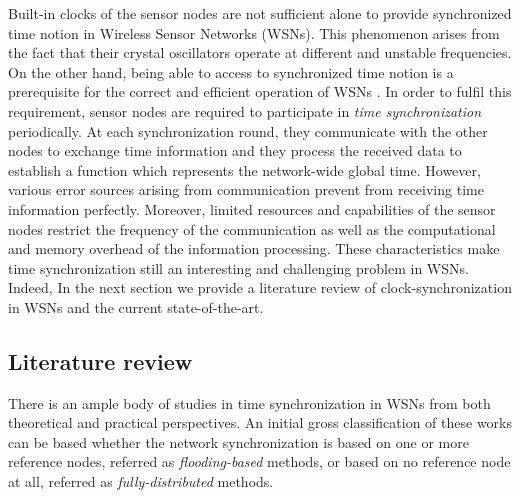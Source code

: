 \documentclass[english,a4paper,10pt,final]{article}
\numberwithin{equation}{section}
\numberwithin{figure}{section}
\begin{document}
Built-in clocks of the sensor nodes are not sufficient alone to provide synchronized time notion in Wireless Sensor Networks (WSNs). This phenomenon arises from the fact that their crystal oscillators operate at different and unstable frequencies. On the other hand, being able to access to synchronized time notion is a prerequisite for the correct and efficient operation of WSNs \cite{Akyildiz2010}. In order to fulfil this requirement, sensor nodes are required to participate in \emph{time synchronization} periodically. At each synchronization round, they communicate with the other nodes to exchange time information and they process the received data to establish a function which represents the network-wide global time. However, various error sources arising from communication prevent from receiving time information perfectly. Moreover, limited resources and capabilities of the sensor nodes restrict the frequency of the communication as well as the computational and memory overhead of the information processing. These characteristics make time synchronization still an interesting and challenging problem in WSNs. Indeed, 
In the next section we provide a literature review of clock-synchronization in WSNs and the current state-of-the-art.  

\subsection{Literature review}

There is an ample body of studies in time synchronization in WSNs from both theoretical and practical perspectives. An initial gross classification of these works can be based whether the network synchronization is based on one or more reference nodes, referred as \emph{flooding-based} methods, or based on no reference node at all, referred as  \emph{fully-distributed} methods.
\end{document}
